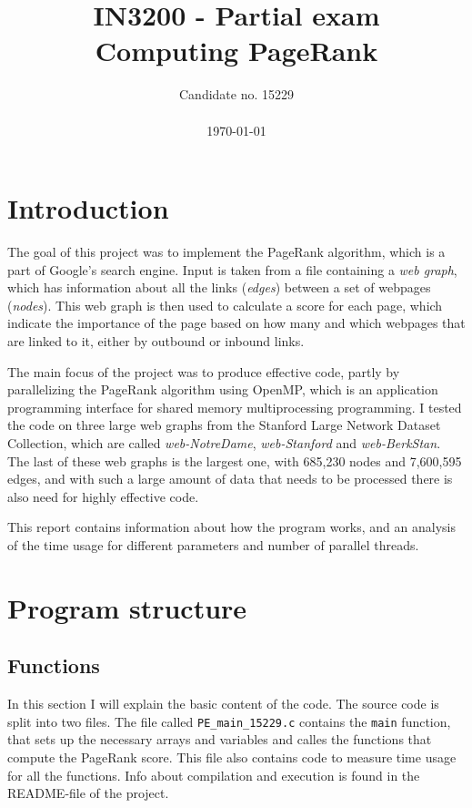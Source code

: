 \documentclass[10pt, a4paper]{amsart}
\title[Computing PageRank]{IN3200 - Partial exam \\ \large
Computing PageRank}
\author[Candidate no. 15229]{Candidate no. 15229 \\ \\ \today}
\numberwithin{figure}{section}
\numberwithin{table}{section}
\begin{document}
\maketitle


\tableofcontents

\section{Introduction}

The goal of this project was to implement the PageRank algorithm, which is a part of Google's search engine. Input is taken from a file containing a \textit{web graph}, which has information about all the links (\textit{edges}) between a set of webpages (\textit{nodes}). This web graph is then used to calculate a score for each page, which indicate the importance of the page based on how many and which webpages that are linked to it, either by outbound or inbound links.

The main focus of the project was to produce effective code, partly by parallelizing the PageRank algorithm using OpenMP, which is an application programming interface for shared memory multiprocessing programming. I tested the code on three large web graphs from the Stanford Large Network Dataset Collection\cite{stanford}, which are called \textit{web-NotreDame}, \textit{web-Stanford} and \textit{web-BerkStan}. The last of these web graphs is the largest one, with 685,230 nodes and 7,600,595 edges, and with such a large amount of data that needs to be processed there is also need for highly effective code.

This report contains information about how the program works, and an analysis of the time usage for different parameters and number of parallel threads.


\section{Program structure}

\subsection{Functions}
In this section I will explain the basic content of the code. The source code is split into two files. The file called \texttt{PE\_main\_15229.c} contains the \texttt{main} function, that sets up the necessary arrays and variables and calles the functions that compute the PageRank score. This file also contains code to measure time usage for all the functions. Info about compilation and execution is found in the README-file of the project.
\end{document}

